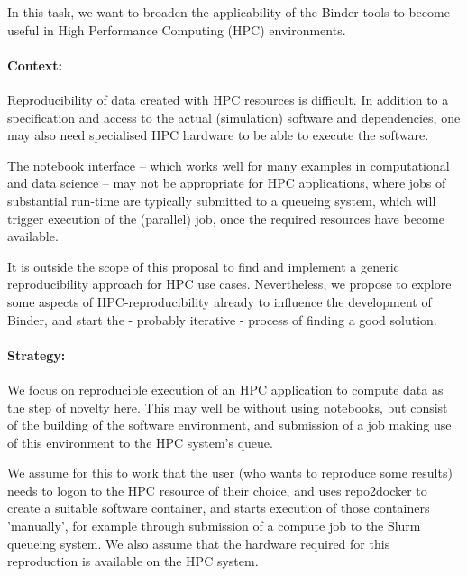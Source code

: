 \begin{task}[
  title=Binder at HPC facilities,
  id=binder-at-hpc,
  lead=SRL,
  PM=1,
  wphases={0-36},
  partners={UIO}
  ]
In this task, we want to broaden the applicability of the Binder tools to become
useful in High Performance Computing (HPC) environments.
  
\paragraph*{Context:}
Reproducibility of data created with HPC resources is difficult. In addition to
a specification and access to the actual (simulation) software and dependencies,
one may also need specialised HPC hardware to be able to execute the software.

The notebook interface -- which works well for many examples in computational and
data science -- may not be appropriate for HPC applications, where jobs of
substantial run-time are typically submitted to a queueing system, which will
trigger execution of the (parallel) job, once the required resources have become
available.

It is outside the scope of this proposal to find and implement a generic
reproducibility approach for HPC use cases. Nevertheless, we propose to explore
some aspects of HPC-reproducibility already to influence the development of Binder,
and start the - probably iterative - process of finding a good solution. 

\paragraph*{Strategy:}
We focus on reproducible execution of an HPC application to compute data as the step of
novelty here. This may well be without using notebooks, but consist of the
building of the software environment, and submission of a job making use of this
environment to the HPC system's queue.

We assume for this to work that the user (who wants to reproduce some results)
needs to logon to the HPC resource of their choice, and uses repo2docker to
create a suitable software container, and starts execution of those containers
'manually', for example through submission of a compute job to the Slurm
queueing system. We also assume that the hardware required for this reproduction
is available on the HPC system.


\end{task}
